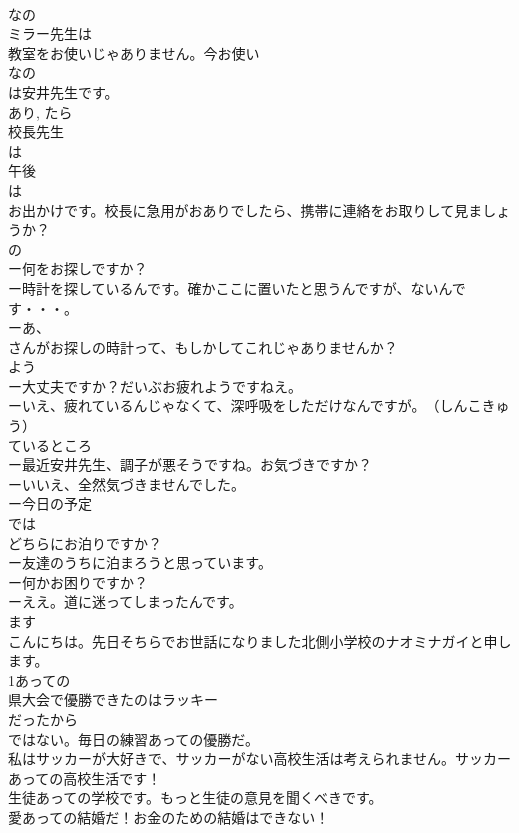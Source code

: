 \documentclass[8pt]{extreport}
\begin{document}
\begin{CJK}{UTF8}{min}
\\	なの 
\\	ミラー先生は
\\	教室をお使いじゃありません。今お使い
\\	なの
\\	は安井先生です。
\\	あり, たら 
\\	校長先生
\\	は
\\	午後
\\	は
\\	お出かけです。校長に急用がおありでしたら、携帯に連絡をお取りして見ましょうか？
\\	の
\\	ー何をお探しですか？
\\	ー時計を探しているんです。確かここに置いたと思うんですが、ないんです・・・。
\\	ーあ、
\\	さんがお探しの時計って、もしかしてこれじゃありませんか？
\\	よう 
\\	ー大丈夫ですか？だいぶお疲れようですねえ。
\\	ーいえ、疲れているんじゃなくて、深呼吸をしただけなんですが。　（しんこきゅう）
\\	ているところ 
\\	ー最近安井先生、調子が悪そうですね。お気づきですか？
\\	ーいいえ、全然気づきませんでした。
\\	ー今日の予定
\\	では
\\	どちらにお泊りですか？
\\	ー友達のうちに泊まろうと思っています。
\\	ー何かお困りですか？
\\	ーええ。道に迷ってしまったんです。
\\	ます
\\	こんにちは。先日そちらでお世話になりました北側小学校のナオミナガイと申します。
\\	1あっての
\\	県大会で優勝できたのはラッキー
\\	だったから
\\	ではない。毎日の練習あっての優勝だ。
\\	私はサッカーが大好きで、サッカーがない高校生活は考えられません。サッカーあっての高校生活です！
\\	生徒あっての学校です。もっと生徒の意見を聞くべきです。
\\	愛あっての結婚だ！お金のための結婚はできない！

\end{CJK}
\end{document}
